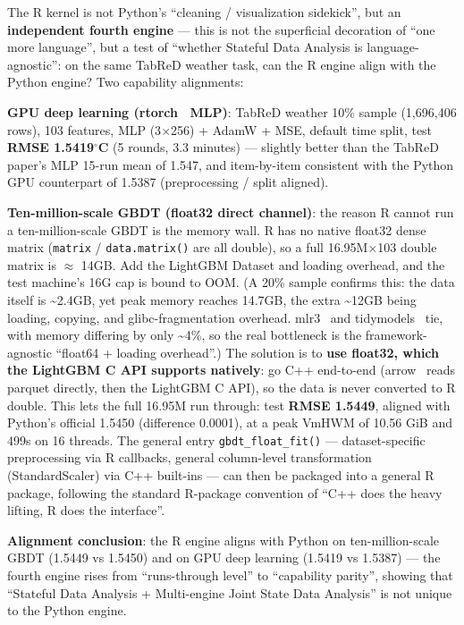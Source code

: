 \documentclass[11pt]{article}
\begin{document}
The R kernel is not Python's ``cleaning / visualization sidekick'', but an \textbf{independent fourth engine} --- this is not the superficial decoration of ``one more language'', but a test of ``whether Stateful Data Analysis is language-agnostic'': on the same TabReD weather task, can the R engine align with the Python engine? Two capability alignments:

\textbf{ GPU deep learning (rtorch~\cite{rtorch} MLP)}: TabReD weather 10\% sample (1,696,406 rows), 103 features, MLP (3$\times$256) + AdamW + MSE, default time split, test \textbf{RMSE 1.5419$^\circ$C} (5 rounds, 3.3 minutes) --- slightly better than the TabReD paper's MLP 15-run mean of 1.547, and item-by-item consistent with the Python GPU counterpart of 1.5387 (preprocessing / split aligned).

\textbf{ Ten-million-scale GBDT (float32 direct channel)}: the reason R cannot run a ten-million-scale GBDT is the memory wall. R has no native float32 dense matrix (\texttt{matrix} / \texttt{data.matrix()} are all double), so a full 16.95M$\times$103 double matrix is $\approx$ 14GB. Add the LightGBM Dataset and loading overhead, and the test machine's 16G cap is bound to OOM. (A 20\% sample confirms this: the data itself is \textasciitilde2.4GB, yet peak memory reaches 14.7GB, the extra \textasciitilde12GB being loading, copying, and glibc-fragmentation overhead. mlr3~\cite{mlr3} and tidymodels~\cite{tidymodels} tie, with memory differing by only \textasciitilde4\%, so the real bottleneck is the framework-agnostic ``float64 + loading overhead''.) The solution is to \textbf{use float32, which the LightGBM C API supports natively}: go C++ end-to-end (arrow~\cite{arrow} reads parquet directly, then the LightGBM C API), so the data is never converted to R double. This lets the full 16.95M run through: test \textbf{RMSE 1.5449}, aligned with Python's official 1.5450 (difference 0.0001), at a peak VmHWM of 10.56 GiB and 499s on 16 threads. The general entry \texttt{gbdt\_float\_fit()} --- dataset-specific preprocessing via R callbacks, general column-level transformation (StandardScaler) via C++ built-ins --- can then be packaged into a general R package, following the standard R-package convention of ``C++ does the heavy lifting, R does the interface''.

\textbf{Alignment conclusion}: the R engine aligns with Python on ten-million-scale GBDT (1.5449 vs 1.5450) and on GPU deep learning (1.5419 vs 1.5387) --- the fourth engine rises from ``runs-through level'' to ``capability parity'', showing that ``Stateful Data Analysis + Multi-engine Joint State Data Analysis'' is not unique to the Python engine.
\end{document}
